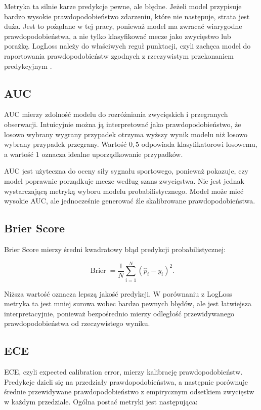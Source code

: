 Metryka ta silnie karze predykcje pewne, ale błędne. Jeżeli model przypisuje bardzo wysokie prawdopodobieństwo zdarzeniu, które nie następuje, strata jest duża. Jest to pożądane w tej pracy, ponieważ model ma zwracać wiarygodne prawdopodobieństwa, a nie tylko klasyfikować mecze jako zwycięstwo lub porażkę. LogLoss należy do właściwych reguł punktacji, czyli zachęca model do raportowania prawdopodobieństw zgodnych z rzeczywistym przekonaniem predykcyjnym \parencite{gneiting2007}.

\subsection{AUC}

AUC mierzy zdolność modelu do rozróżniania zwycięskich i przegranych obserwacji. Intuicyjnie można ją interpretować jako prawdopodobieństwo, że losowo wybrany wygrany przypadek otrzyma wyższy wynik modelu niż losowo wybrany przypadek przegrany. Wartość \(0{,}5\) odpowiada klasyfikatorowi losowemu, a wartość \(1\) oznacza idealne uporządkowanie przypadków.

AUC jest użyteczna do oceny siły sygnału sportowego, ponieważ pokazuje, czy model poprawnie porządkuje mecze według szans zwycięstwa. Nie jest jednak wystarczającą metryką wyboru modelu probabilistycznego. Model może mieć wysokie AUC, ale jednocześnie generować źle skalibrowane prawdopodobieństwa.

\subsection{Brier Score}

Brier Score mierzy średni kwadratowy błąd predykcji probabilistycznej:

\begin{equation}
    \operatorname{Brier} = \frac{1}{N}\sum_{i=1}^{N}(\hat{p}_i - y_i)^2.
\end{equation}

Niższa wartość oznacza lepszą jakość predykcji. W porównaniu z LogLoss metryka ta jest mniej surowa wobec bardzo pewnych błędów, ale jest łatwiejsza interpretacyjnie, ponieważ bezpośrednio mierzy odległość przewidywanego prawdopodobieństwa od rzeczywistego wyniku.

\subsection{ECE}

ECE, czyli expected calibration error, mierzy kalibrację prawdopodobieństw. Predykcje dzieli się na przedziały prawdopodobieństwa, a następnie porównuje średnie przewidywane prawdopodobieństwo z empirycznym odsetkiem zwycięstw w każdym przedziale. Ogólna postać metryki jest następująca:

